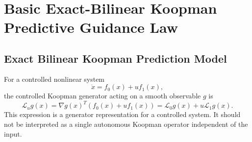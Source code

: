 \documentclass[letterpaper,journal]{IEEEtran}
\begin{document}
\section{Basic Exact-Bilinear Koopman Predictive Guidance Law}

\subsection{Exact Bilinear Koopman Prediction Model}
For a controlled nonlinear system
\begin{equation}
    \dot x=f_0(x)+u f_1(x),
\end{equation}
the controlled Koopman generator acting on a smooth observable $g$ is
\begin{equation}
    \mathcal L_u g(x)=\nabla g(x)^T(f_0(x)+u f_1(x))
    =\mathcal L_0g(x)+u\mathcal L_1g(x).
\end{equation}
This expression is a generator representation for a controlled system. It should not be interpreted as a single autonomous Koopman operator independent of the input.
\end{document}

